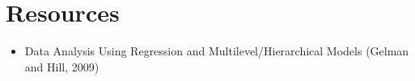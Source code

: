 \documentclass[12pt]{article}
\begin{document}
\section{Resources}
\begin{itemize}
\item Data Analysis Using Regression and Multilevel/Hierarchical Models (Gelman and Hill, 2009)
\end{itemize}
\end{document}
